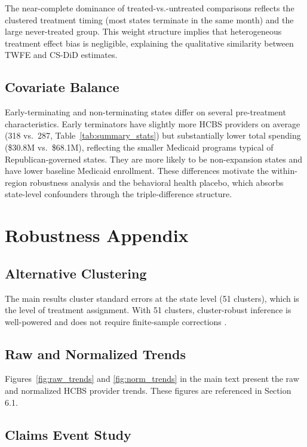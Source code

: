 \documentclass[12pt]{article}
\begin{document}
The near-complete dominance of treated-vs.-untreated comparisons reflects the clustered treatment timing (most states terminate in the same month) and the large never-treated group. This weight structure implies that heterogeneous treatment effect bias is negligible, explaining the qualitative similarity between TWFE and CS-DiD estimates.

\subsection{Covariate Balance}

Early-terminating and non-terminating states differ on several pre-treatment characteristics. Early terminators have slightly more HCBS providers on average (318 vs.\ 287, Table~\ref{tab:summary_stats}) but substantially lower total spending (\$30.8M vs.\ \$68.1M), reflecting the smaller Medicaid programs typical of Republican-governed states. They are more likely to be non-expansion states and have lower baseline Medicaid enrollment. These differences motivate the within-region robustness analysis and the behavioral health placebo, which absorbs state-level confounders through the triple-difference structure.

\section{Robustness Appendix}

\subsection{Alternative Clustering}

The main results cluster standard errors at the state level (51 clusters), which is the level of treatment assignment. With 51 clusters, cluster-robust inference is well-powered and does not require finite-sample corrections \citep{cameron2008}.

\subsection{Raw and Normalized Trends}

Figures~\ref{fig:raw_trends} and \ref{fig:norm_trends} in the main text present the raw and normalized HCBS provider trends. These figures are referenced in Section 6.1.

\subsection{Claims Event Study}
\end{document}
